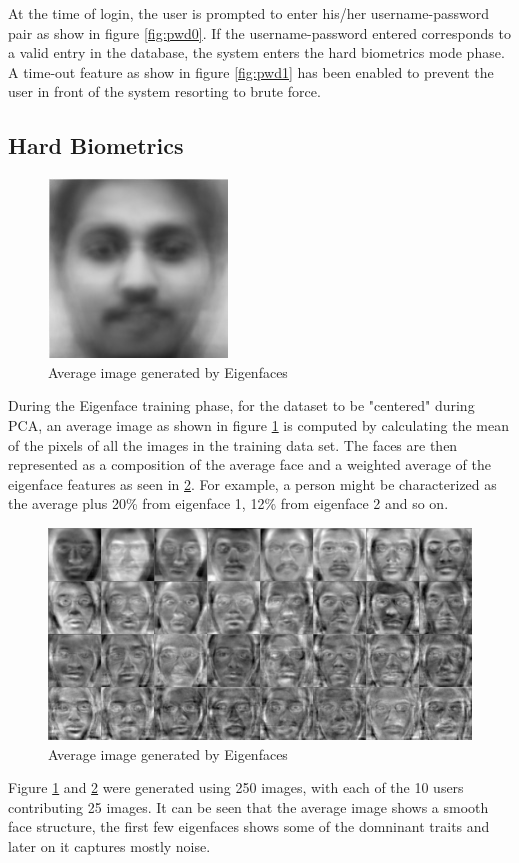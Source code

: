 \documentclass[%
        submission,
        notitlepage,
        narroweqnarray,
        inline,
        ]{ieee}
\begin{document}
At the time of login, the user is prompted to enter his/her username-password pair as show  in figure \ref{fig:pwd0}.
If the username-password entered corresponds to a valid entry in the database, the system enters the hard biometrics mode phase.
A time-out feature as show in figure \ref{fig:pwd1} has been enabled to prevent the user in front of the system resorting to brute force. 

\subsection{Hard Biometrics}
\begin{figure}[h!]
	\centering
	\includegraphics[scale=0.5]{img/avg.jpeg}
	\caption{Average image generated by Eigenfaces}
	\label{fig:avg}
\end{figure}
During the Eigenface training phase, for the dataset to be "centered" during PCA, an average image as shown in figure \ref{fig:avg} is computed by calculating the mean of the pixels of all the images in the training data set. 
The faces are then represented as a composition of the average face and a weighted average of the eigenface features as seen in \ref{fig:eigen}.
For example, a person might be characterized as the average plus 20\% from eigenface 1, 12\% from eigenface 2 and so on.
\begin{figure}[h!]
	\centering
	\includegraphics[scale=0.15]{img/eigen.png}
	\caption{Average image generated by Eigenfaces}
	\label{fig:eigen}
\end{figure}
Figure \ref{fig:avg} and \ref{fig:eigen} were generated using 250 images, with each of the 10 users contributing 25 images.
It can be seen that the average image shows a smooth face structure, the first few eigenfaces shows some of the domninant traits and later on it captures mostly noise.
\end{document}
